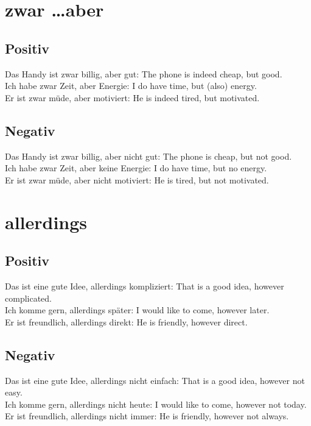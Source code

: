\documentclass[a4paper]{article}
\title{}
\date{}
\begin{document}
    \maketitle
    
    
    \section{zwar \dots aber}
        
        \subsection{Positiv}
            Das Handy ist zwar billig, aber gut: The phone is indeed cheap, but good. \\
            Ich habe zwar Zeit, aber Energie: I do have time, but (also) energy. \\
            Er ist zwar müde, aber motiviert: He is indeed tired, but motivated. \\
        
        \subsection{Negativ}
            Das Handy ist zwar billig, aber nicht gut: The phone is cheap, but not good. \\
            Ich habe zwar Zeit, aber keine Energie: I do have time, but no energy. \\
            Er ist zwar müde, aber nicht motiviert: He is tired, but not motivated. \\
    
    
    \section{allerdings}
        
        \subsection{Positiv}
            Das ist eine gute Idee, allerdings kompliziert: That is a good idea, however complicated. \\
            Ich komme gern, allerdings später: I would like to come, however later. \\
            Er ist freundlich, allerdings direkt: He is friendly, however direct. \\
        
        \subsection{Negativ}
            Das ist eine gute Idee, allerdings nicht einfach: That is a good idea, however not easy. \\
            Ich komme gern, allerdings nicht heute: I would like to come, however not today. \\
            Er ist freundlich, allerdings nicht immer: He is friendly, however not always. \\
    
\end{document}
